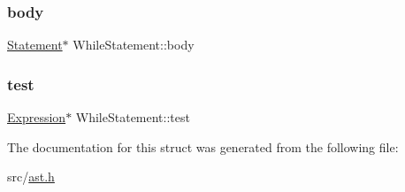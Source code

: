 \subsubsection{\texorpdfstring{body}{body}}
{\footnotesize\ttfamily \hyperlink{struct_statement}{Statement}$\ast$ While\+Statement\+::body}

\mbox{\label{struct_while_statement_acfede7e3d617c685032f657a7a95aa15}} 
\subsubsection{\texorpdfstring{test}{test}}
{\footnotesize\ttfamily \hyperlink{struct_expression}{Expression}$\ast$ While\+Statement\+::test}



The documentation for this struct was generated from the following file\+:\begin{DoxyCompactItemize}
\item 
src/\hyperlink{ast_8h}{ast.\+h}\end{DoxyCompactItemize}
